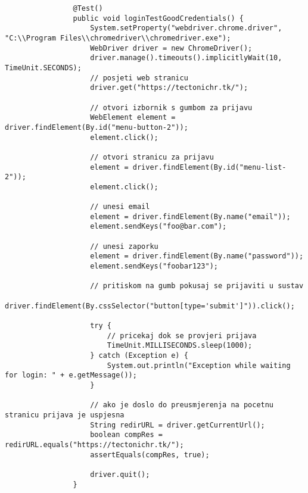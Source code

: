 			 \begin{lstlisting}
				@Test()
				public void loginTestGoodCredentials() {
					System.setProperty("webdriver.chrome.driver", "C:\\Program Files\\chromedriver\\chromedriver.exe");
					WebDriver driver = new ChromeDriver();
					driver.manage().timeouts().implicitlyWait(10, TimeUnit.SECONDS);
					// posjeti web stranicu
					driver.get("https://tectonichr.tk/");

					// otvori izbornik s gumbom za prijavu
					WebElement element = driver.findElement(By.id("menu-button-2"));
					element.click();

					// otvori stranicu za prijavu
					element = driver.findElement(By.id("menu-list-2"));
					element.click();

					// unesi email
					element = driver.findElement(By.name("email"));
					element.sendKeys("foo@bar.com");

					// unesi zaporku
					element = driver.findElement(By.name("password"));
					element.sendKeys("foobar123");

					// pritiskom na gumb pokusaj se prijaviti u sustav
					driver.findElement(By.cssSelector("button[type='submit']")).click();

					try {
						// pricekaj dok se provjeri prijava
						TimeUnit.MILLISECONDS.sleep(1000);
					} catch (Exception e) {
						System.out.println("Exception while waiting for login: " + e.getMessage());
					}

					// ako je doslo do preusmjerenja na pocetnu stranicu prijava je uspjesna
					String redirURL = driver.getCurrentUrl();
					boolean compRes = redirURL.equals("https://tectonichr.tk/");
					assertEquals(compRes, true);

					driver.quit();
				}
			\end{lstlisting}

